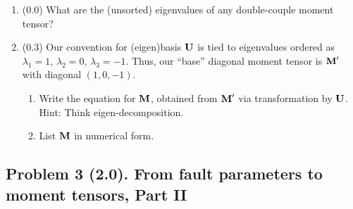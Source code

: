 \documentclass[11pt,titlepage,fleqn]{article}
\begin{document}
\begin{enumerate}

\item (0.0) What are the (unsorted) eigenvalues of any double-couple moment tensor?


\item (0.3) Our convention for (eigen)basis $\mbox{${\bf U}$}$ is tied to eigenvalues ordered as $\lambda_1 = 1$, $\lambda_2 = 0$, $\lambda_3 = -1$. Thus, our ``base'' diagonal moment tensor is $\mbox{${\bf M}$}'$ with diagonal $(1, 0, -1)$.
%
\begin{enumerate}
\item Write the equation for $\mbox{${\bf M}$}$, obtained from $\mbox{${\bf M}$}'$ via transformation by $\mbox{${\bf U}$}$. \\
Hint: Think eigen-decomposition.
\item List $\mbox{${\bf M}$}$ in numerical form.
\end{enumerate}

\end{enumerate}


\subsection*{Problem 3 (2.0). From fault parameters to moment tensors, Part II}
\end{document}
